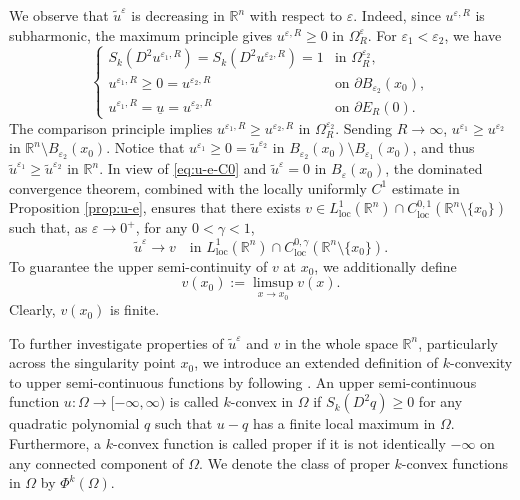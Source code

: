 \documentclass[reqno]{amsart}
\theoremstyle{remark}
\theoremstyle{definition}
\numberwithin{equation}{section}
\begin{document}
We observe that $\tilde{u}^{\varepsilon}$ is decreasing in $\mathbb{R}^n$ with respect to $\varepsilon$. Indeed, since $u^{\varepsilon,R}$ is subharmonic, the maximum principle gives $u^{\varepsilon,R}\geq0$ in $\Omega_R^\varepsilon$. For $\varepsilon_1<\varepsilon_2$, we have 
\begin{equation*}
	\begin{cases}
		S_k(D^2u^{\varepsilon_1,R})=S_k(D^2u^{\varepsilon_2,R})=1 & \text{in }\Omega_R^{\varepsilon_2}, \\
		u^{\varepsilon_1,R}\geq 0=u^{\varepsilon_2,R} & \text{on }\partial B_{\varepsilon_2}(x_0), \\
		u^{\varepsilon_1,R}=\underline{u}=u^{\varepsilon_2,R} & \text{on }\partial E_R(0).
	\end{cases} 
\end{equation*} 
The comparison principle implies $u^{\varepsilon_1,R}\geq u^{\varepsilon_2,R}$ in $\Omega_R^{\varepsilon_2}$. Sending $R\to\infty$, $u^{\varepsilon_1}\geq u^{\varepsilon_2}$ in $\mathbb{R}^n\setminus B_{\varepsilon_2}(x_0)$. Notice that $u^{\varepsilon_1}\geq0=\tilde{u}^{\varepsilon_2}$ in $B_{\varepsilon_2}(x_0)\setminus B_{\varepsilon_1}(x_0)$, and thus $\tilde{u}^{\varepsilon_1}\geq\tilde{u}^{\varepsilon_2}$ in $\mathbb{R}^n$. In view of \eqref{eq:u-e-C0} and $\tilde{u}^\varepsilon=0$ in $B_\varepsilon(x_0)$,
the dominated convergence theorem, combined with the locally uniformly $C^1$ estimate in Proposition \ref{prop:u-e}, ensures that there exists $v\in L^1_{\mathrm{loc}}(\mathbb{R}^n)\cap C^{0,1}_{\mathrm{loc}}(\mathbb{R}^n\setminus\{x_0\})$ such that, as $\varepsilon\to 0^+$, for any $0<\gamma<1$, 
\begin{equation}\label{eq:u-e-v}
	\tilde{u}^\varepsilon\to v\quad\text{in }L^1_{\mathrm{loc}}(\mathbb{R}^n)\cap C^{0,\gamma}_{\mathrm{loc}}(\mathbb{R}^n\setminus\{x_0\}).
\end{equation}
To guarantee the upper semi-continuity of $v$ at $x_0$, we additionally define 
$$v(x_0):=\limsup_{x\to x_0}v(x).$$
Clearly, $v(x_0)$ is finite.

To further investigate properties of $\tilde{u}^\varepsilon$ and $v$ in the whole space $\mathbb{R}^n$, particularly across the singularity point $x_0$, we introduce an extended definition of $k$-convexity to upper semi-continuous functions by following \cite{Trudinger-Wang-II, Trudinger-Wang-III}. An upper semi-continuous function $u: \Omega\to[-\infty,\infty)$ is called $k$-convex in $\Omega$ if $S_k(D^2q)\geq0$ for any quadratic polynomial $q$ such that $u-q$ has a finite local maximum in $\Omega$. Furthermore, a $k$-convex function is called proper if it is not identically $-\infty$ on any connected component of $\Omega$. We denote the class of proper $k$-convex functions in $\Omega$ by $\Phi^k(\Omega)$.
\end{document}
